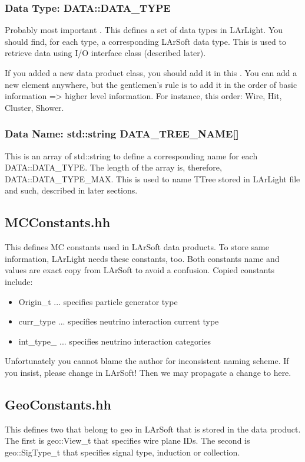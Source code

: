 \subsubsection{Data Type: {\ttfamily \enum DATA::DATA\_TYPE}}
Probably most important \enum. This defines a set of data types in LArLight.
You should find, for each type, a corresponding LArSoft data type.
This is used to retrieve data using I/O interface class (described later).

If you added a new data product class, you should add it in this \enum.
You can add a new element anywhere, but the gentlemen's rule is to add it
in the order of basic information => higher level information.
For instance, this order: {\ttfamily Wire, Hit, Cluster, Shower}.

\subsubsection{Data Name: {\ttfamily std::string DATA\_TREE\_NAME[]}}
This is an array of {\ttfamily std::string} to define a corresponding name for
each {\ttfamily DATA::DATA\_TYPE}. The length of the array is, therefore,
{\ttfamily DATA::DATA\_TYPE\_MAX}. This is used to name {\ttfamily TTree}
stored in LArLight \ROOT file and such, described in later sections.

\subsection{MCConstants.hh}
This defines MC constants used in LArSoft data products.
To store same information, LArLight needs these constants, too.
Both constants name and values are exact copy from LArSoft to avoid a confusion.
Copied constants include:
\begin{itemize}
\item[] {\ttfamily Origin\_t} ... specifies particle generator type
\item[] {\ttfamily curr\_type} ... specifies neutrino interaction current type
\item[] {\ttfamily int\_type\_} ... specifies neutrino interaction categories
\end{itemize}
Unfortunately you cannot blame the author for inconsistent naming scheme. 
If you insist, please change in LArSoft! Then we may propagate a change to here.

\subsection{GeoConstants.hh}
This defines two \enum that belong to {\ttfamily geo} in LArSoft that is stored in the data product.
The first is {\ttfamily geo::View\_t} that specifies wire plane IDs.
The second is {\ttfamily geo::SigType\_t} that specifies signal type, induction or collection.


